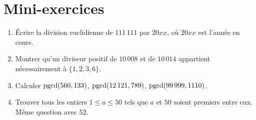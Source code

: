 \section*{Mini-exercices}

\begin{frame}
\begin{miniexercice}
\begin{enumerate}
  \item \'Ecrire la division euclidienne de $111\,111$ par $20xx$, où $20xx$ est l'année en cours.
  \item Montrer qu'un diviseur positif de $10\,008$ et de $10\,014$ appartient nécessairement à $\{1,2,3,6\}$.
  \item Calculer $\mathop{\text{pgcd}}\nolimits(560,133)$, $\mathop{\text{pgcd}}\nolimits(12\,121,789)$, $\mathop{\text{pgcd}}\nolimits(99\,999,1110)$.
  \item Trouver tous les entiers $1\le a \le 50$ tels que $a$ et $50$ soient premiers entre eux.
Même question avec $52$.
\end{enumerate}  
\end{miniexercice}
\end{frame}


